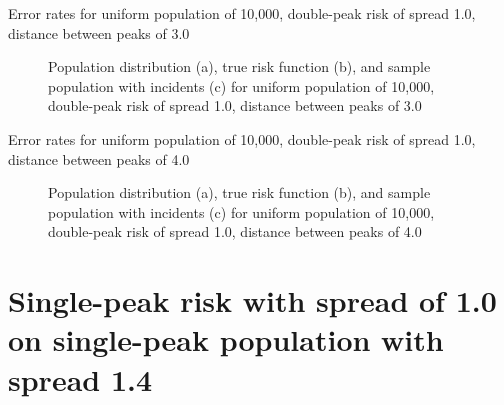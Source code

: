 \graphicspath{{./results/unif_100_1_2h_3/}}
\makeatletter
{}
\makeatother

\begin{table}[H]
    
    \caption[]{Error rates for uniform population of 10,000, double-peak risk of \gls{spread} 1.0, distance between peaks of 3.0}
    \label{tab:mean_error_rates:unif_100_1_2h_3}
\end{table}

\begin{figure}[H]
    
    \caption[]{Population distribution (a), true risk function (b), and sample population with incidents (c) for uniform population of 10,000, double-peak risk of \gls{spread} 1.0, distance between peaks of 3.0}
    \label{fig:distributions:unif_100_1_2h_3}    
\end{figure}

\graphicspath{{./results/unif_100_1_2h_4/}}
\makeatletter
{}
\makeatother

\begin{table}[H]
    
    \caption[]{Error rates for uniform population of 10,000, double-peak risk of \gls{spread} 1.0, distance between peaks of 4.0}
    \label{tab:mean_error_rates:unif_100_1_2h_4}
\end{table}

\begin{figure}[H]
    
    \caption[]{Population distribution (a), true risk function (b), and sample population with incidents (c) for uniform population of 10,000, double-peak risk of \gls{spread} 1.0, distance between peaks of 4.0}
    \label{fig:distributions:unif_100_1_2h_4}    
\end{figure}

\section{Single-peak risk with spread of 1.0 on single-peak population with spread 1.4}
\label{sec:app:results_p1.4_100_1_1h_X}

